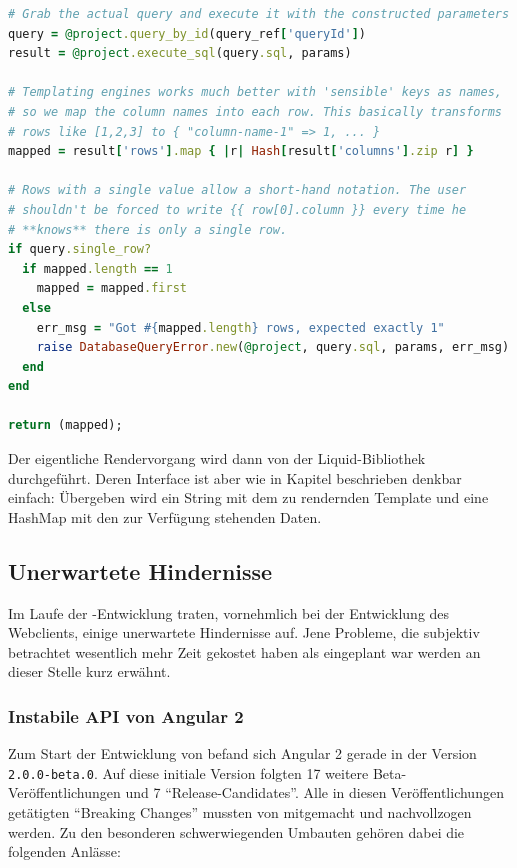 \begin{lstlisting}[float=p, language=Ruby, caption={Renderdaten einer Abfrage (2): Ausführen und transformieren}, label={lst:server-project-query-map-results}]
# Grab the actual query and execute it with the constructed parameters
query = @project.query_by_id(query_ref['queryId'])
result = @project.execute_sql(query.sql, params)

# Templating engines works much better with 'sensible' keys as names,
# so we map the column names into each row. This basically transforms
# rows like [1,2,3] to { "column-name-1" => 1, ... }
mapped = result['rows'].map { |r| Hash[result['columns'].zip r] }

# Rows with a single value allow a short-hand notation. The user
# shouldn't be forced to write {{ row[0].column }} every time he
# **knows** there is only a single row.
if query.single_row?
  if mapped.length == 1
    mapped = mapped.first
  else
    err_msg = "Got #{mapped.length} rows, expected exactly 1"
    raise DatabaseQueryError.new(@project, query.sql, params, err_msg)
  end
end

return (mapped);
\end{lstlisting}

Der eigentliche Rendervorgang wird dann von der Liquid-Bibliothek durchgeführt. Deren Interface ist aber wie in Kapitel  beschrieben denkbar einfach: Übergeben wird ein String mit dem zu rendernden Template und eine HashMap mit den zur Verfügung stehenden Daten.

\subsection{Unerwartete Hindernisse}
\label{sec:unexpected-problems}

Im Laufe der \idename{}-Entwicklung traten, vornehmlich bei der Entwicklung des Webclients, einige unerwartete Hindernisse auf. Jene Probleme, die subjektiv betrachtet wesentlich mehr Zeit gekostet haben als eingeplant war werden an dieser Stelle kurz erwähnt.

\subsubsection{Instabile API von Angular 2}

Zum Start der Entwicklung von \idename{} befand sich Angular 2 gerade in der Version \texttt{2.0.0-beta.0}. Auf diese initiale Version folgten 17 weitere Beta-Veröffentlichungen und 7 "`Release-Candidates"'. Alle in diesen Veröffentlichungen getätigten "`Breaking Changes"' mussten von \idename{} mitgemacht und nachvollzogen werden. Zu den besonderen schwerwiegenden Umbauten gehören dabei die folgenden Anlässe:

